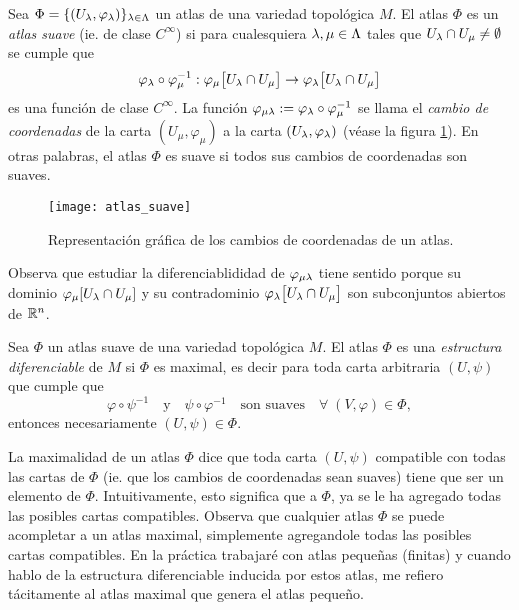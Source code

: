 \documentclass[../../topologia_algebraica]{subfiles}
\begin{document}
\begin{defin}
  Sea $\Phi=\{(U_{\lambda},\varphi_{\lambda})\}_{\lambda\in\Lambda}$ un atlas de una variedad topol\'ogica
  $M$. El atlas $\Phi$ es un \emph{atlas suave} (ie. de clase $C^{\infty}$) si para cualesquiera
  $\lambda,\mu\in\Lambda$ tales que $U_{\lambda}\cap U_{\mu}\neq\emptyset$ se cumple que
  \[
    \varphi_{\lambda}\circ\varphi_{\mu}^{-1}:
    \varphi_{\mu}\big[U_{\lambda}\cap U_{\mu}\big]\rightarrow\varphi_{\lambda}\big[ U_{\lambda}\cap U_{\mu} \big]
  \]
  es una funci\'on de clase $C^{\infty}$. La funci\'on
  $\varphi_{\mu\lambda}:=\varphi_{\lambda}\circ\varphi_{\mu}^{-1}$ se llama el \emph{cambio de coordenadas}
  de la carta $(U_{\mu},\varphi_{\mu})$ a la carta $(U_{\lambda},\varphi_{\lambda})$
  (v\'ease la figura \ref{fig:atlas_suave}). En otras palabras,
  el atlas $\Phi$ es suave si todos sus cambios de coordenadas son suaves.
\end{defin}
\begin{figure}[ht]\label{fig:atlas_suave}%
  \centering
  \caption{Representaci\'on gr\'afica de los cambios de coordenadas de un atlas.}
  \texttt{[image: atlas\_suave]}
\end{figure}%

Observa que estudiar la diferenciablididad de $\varphi_{\mu\lambda}$ tiene sentido porque su dominio
$\varphi_{\mu}[U_{\lambda}\cap U_{\mu}]$  y su contradominio $\varphi_{\lambda}\big[U_{\lambda}\cap U_{\mu}\big]$
son subconjuntos abiertos de $\mathbb{R}^n$.

\begin{defin} Sea $\Phi$ un atlas suave de una variedad topol\'ogica $M$. El atlas $\Phi$
  es una \emph{estructura diferenciable} de $M$ si $\Phi$ es maximal, es decir para toda
  carta arbitraria $(U,\psi)$ que cumple que
  \[
    \varphi\circ\psi^{-1} \quad\text{y}\quad \psi\circ\varphi^{-1}\quad\text{son suaves}\quad
    \forall \; (V,\varphi)\in\Phi,
  \]
  entonces necesariamente $(U,\psi)\in\Phi$.
\end{defin}

La maximalidad de un atlas $\Phi$ dice que toda carta $(U,\psi)$ compatible con todas las cartas de
$\Phi$ (ie. que los cambios de coordenadas sean suaves) tiene que ser un elemento de $\Phi$.
Intuitivamente, esto significa que a $\Phi$, ya se le ha agregado todas las posibles cartas
compatibles. Observa que cualquier atlas $\Phi$ se puede acompletar a un atlas maximal, simplemente
agregandole todas las posibles cartas compatibles. En la pr\'actica trabajar\'e con atlas peque\~nas
(finitas) y cuando hablo de la estructura diferenciable inducida por estos atlas, me refiero
t\'acitamente al atlas maximal que genera el atlas peque\~no.
\end{document}
